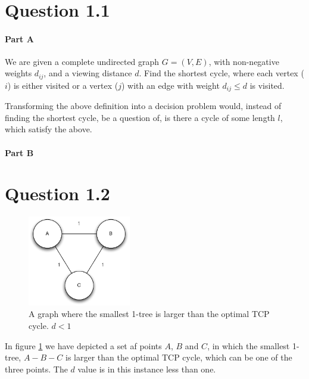 \documentclass[10pt]{article}
\author{\authorName \\\texttt{\small{\authorEmail}}}
\title{\textsc{\titleName \\ \courseName}}
\begin{document}
\maketitle    

\section*{Question 1.1} %
\label{sec:question_1_1}
\paragraph{Part A} %
\label{par:part_a}
We are given a complete undirected graph $G = (V,E)$, with non-negative weights $d_{ij}$, and a viewing distance $d$.
Find the shortest cycle, where each vertex ($i$) is either visited or a vertex ($j$) with an edge with weight $d_{ij} \leq d$ is visited.

Transforming the above definition into a decision problem would, instead of finding the shortest cycle, be a question of, is there a cycle of some length $l$, which satisfy the above.



\paragraph{Part B} %
\label{par:part_b}


\section*{Question 1.2} %
\label{sec:question_1_2}

\begin{figure}
	\centering
	\includegraphics[width=0.4\textwidth]{figures/unicycle.pdf}
	\caption{A graph where the smallest 1-tree is larger than the optimal TCP cycle. $d<1$}
	\label{unicycle}
\end{figure}
In figure \ref{unicycle} we have depicted a set af points $A$, $B$ and $C$, in which the smallest 1-tree, $A-B-C$ is larger than the optimal TCP cycle, which can be one of the three points.
The $d$ value is in this instance less than one.
\end{document}
